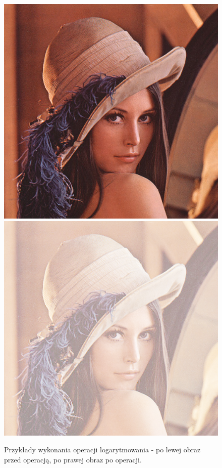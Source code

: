 \documentclass{article}
\begin{document}
\begin{figure}[!htb]
\includegraphics[scale=0.269]{img/lena_24bit.png} 
\includegraphics[scale=0.2]{img/_Logarytmowanie_Obrazu_lena_24bit.png} 
\caption{Przykłady wykonania operacji logarytmowania - po lewej obraz przed operacją, po prawej obraz po operacji. }
\end{figure}
\end{document}
